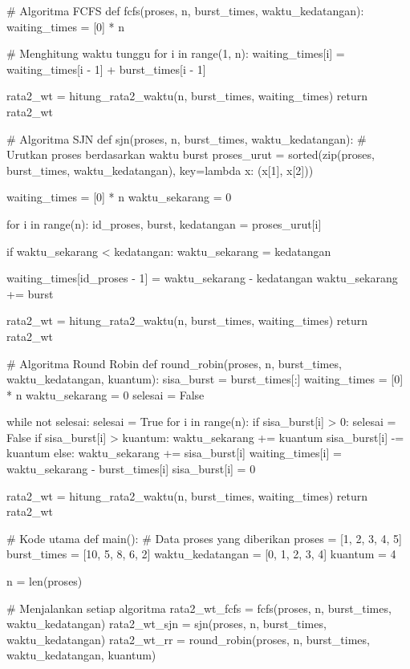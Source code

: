 \documentclass[12pt]{article}
\begin{document}
\begin{itemize}
\begin{python}
# Algoritma FCFS
def fcfs(proses, n, burst_times, waktu_kedatangan):
    waiting_times = [0] * n

    # Menghitung waktu tunggu
    for i in range(1, n):
        waiting_times[i] = waiting_times[i - 1] + burst_times[i - 1]

    rata2_wt = hitung_rata2_waktu(n, burst_times, waiting_times)
    return rata2_wt

# Algoritma SJN
def sjn(proses, n, burst_times, waktu_kedatangan):
    # Urutkan proses berdasarkan waktu burst
    proses_urut = sorted(zip(proses, burst_times, waktu_kedatangan), key=lambda x: (x[1], x[2]))
    
    waiting_times = [0] * n
    waktu_sekarang = 0
    
    for i in range(n):
        id_proses, burst, kedatangan = proses_urut[i]
        
        if waktu_sekarang < kedatangan:
            waktu_sekarang = kedatangan
        
        waiting_times[id_proses - 1] = waktu_sekarang - kedatangan
        waktu_sekarang += burst

    rata2_wt = hitung_rata2_waktu(n, burst_times, waiting_times)
    return rata2_wt

# Algoritma Round Robin
def round_robin(proses, n, burst_times, waktu_kedatangan, kuantum):
    sisa_burst = burst_times[:]  
    waiting_times = [0] * n
    waktu_sekarang = 0
    selesai = False
    
    while not selesai:
        selesai = True
        for i in range(n):
            if sisa_burst[i] > 0:
                selesai = False
                if sisa_burst[i] > kuantum:
                    waktu_sekarang += kuantum
                    sisa_burst[i] -= kuantum
                else:
                    waktu_sekarang += sisa_burst[i]
                    waiting_times[i] = waktu_sekarang - burst_times[i]
                    sisa_burst[i] = 0

    rata2_wt = hitung_rata2_waktu(n, burst_times, waiting_times)
    return rata2_wt

# Kode utama
def main():
    # Data proses yang diberikan
    proses = [1, 2, 3, 4, 5]
    burst_times = [10, 5, 8, 6, 2]
    waktu_kedatangan = [0, 1, 2, 3, 4]
    kuantum = 4

    n = len(proses)

    # Menjalankan setiap algoritma
    rata2_wt_fcfs = fcfs(proses, n, burst_times, waktu_kedatangan)
    rata2_wt_sjn = sjn(proses, n, burst_times, waktu_kedatangan)
    rata2_wt_rr = round_robin(proses, n, burst_times, waktu_kedatangan, kuantum)


\end{python}
\end{itemize}
\end{document}
